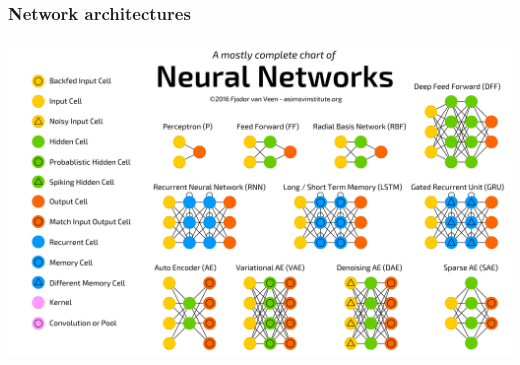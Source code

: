 \documentclass[12pt, aspectratio = 169]{beamer}
\begin{document}

\begin{frame}[t]
	\frametitle{Network architectures}
	\centering
	\vspace{-0.5em}
	\includegraphics[width=0.8\linewidth]{networkZooPoster_1}
\end{frame}

\end{document}
